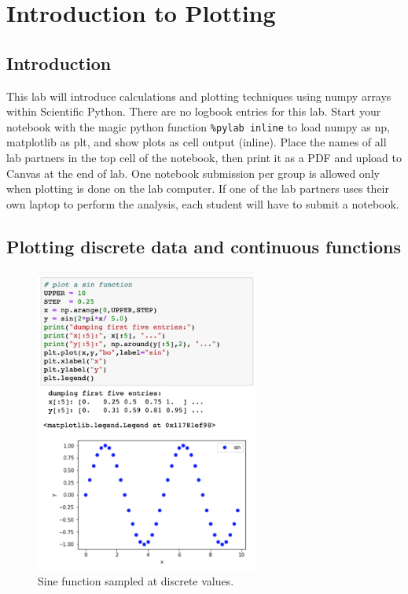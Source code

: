 \chapter{Introduction to Plotting}

\section{Introduction}
This lab will introduce calculations and plotting techniques using numpy arrays within Scientific Python. There are no logbook entries for this lab. 
Start your notebook with the magic python function {\tt\%pylab inline} to load numpy as np, matplotlib as plt, and show plots as cell output (inline). Place the names of all lab partners in the top cell of the notebook, then print it as a PDF and upload to Canvas at the end of lab. One notebook submission per group is allowed only when plotting is done on the lab computer. If one of the lab partners uses their own laptop to perform the analysis, each student will have to submit a notebook.

\section{Plotting discrete data and continuous functions}

\begin{figure}[htbp]
\begin{center}
\includegraphics[width=0.65\textwidth]{figs/labs//plotting/plotting.png} 
\caption{Sine function sampled at discrete values.}
\label{fig:plotsin}
\end{center}
\end{figure}

